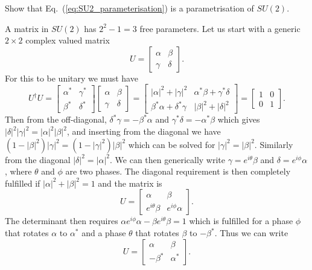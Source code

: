 \documentclass[notes.tex]{subfiles}
\begin{document}
\begin{Exercise}[difficulty=2]
Show that Eq.~(\ref{eq:SU2_parameterisation}) is a parametrisation of $SU(2)$.
\end{Exercise}
\begin{Answer}
A matrix in $SU(2)$ has $2^2-1=3$ free parameters. Let us start with a generic $2\times2$ complex valued matrix
\[ U=\left[ \begin{matrix} \alpha & \beta \\ \gamma & \delta \end{matrix} \right]. \]
For this to be unitary we must have 
\[ U^\dagger U=\left[ \begin{matrix} \alpha^* & \gamma^* \\ \beta^* & \delta^* \end{matrix} \right]\left[ \begin{matrix} \alpha & \beta \\ \gamma & \delta \end{matrix} \right] 
=\left[ \begin{matrix} |\alpha|^2+|\gamma|^2 & \alpha^*\beta+\gamma^*\delta \\ \beta^*\alpha+\delta^*\gamma & |\beta|^2+|\delta|^2 \end{matrix} \right]
=\left[ \begin{matrix} 1 & 0 \\ 0 & 1 \end{matrix} \right].\]
Then from the off-diagonal, $\delta^*\gamma=-\beta^*\alpha$ and $\gamma^*\delta=-\alpha^*\beta$ which gives $|\delta|^2|\gamma|^2= |\alpha|^2 |\beta|^2$, and inserting from the diagonal we have $(1-|\beta|^2)|\gamma|^2= (1-|\gamma|^2) |\beta|^2$ which can be solved for $|\gamma|^2= |\beta|^2$. Similarly from the diagonal $|\delta|^2=|\alpha|^2$. We can then generically  write $\gamma=e^{i\theta}\beta$ and $\delta=e^{i\phi}\alpha$, where $\theta$ and $\phi$ are two phases. The diagonal requirement is then completely fulfilled if $|\alpha|^2+|\beta|^2=1$ and the matrix is
\[ U=\left[ \begin{matrix} \alpha & \beta \\ e^{i\theta}\beta & e^{i\phi}\alpha \end{matrix} \right]. \]
The determinant then requires $\alpha e^{i\phi}\alpha-\beta e^{i\theta}\beta=1$ which is fulfilled for a phase $\phi$ that rotates $\alpha$ to  $\alpha^*$ and a phase $\theta$ that rotates $\beta$ to $-\beta^*$. Thus we can write
\[ U=\left[ \begin{matrix} \alpha & \beta \\ -\beta^* & \alpha^* \end{matrix} \right]. \]
\end{Answer}
\end{document}
